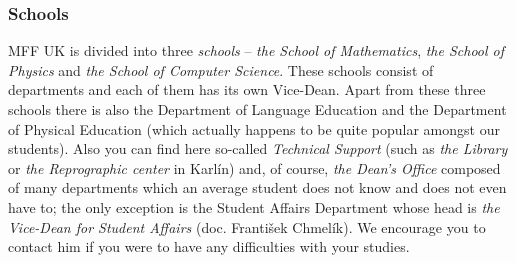 \subsubsection{Schools}
MFF UK is divided into three \textit{schools} – \textit{the School of
Mathematics}, \textit{the School of Physics} and \textit{the School of Computer
Science}. These schools consist of departments and each of them has its own
Vice-Dean.
Apart from these three schools there is also the Department of Language
Education and the Department of Physical Education (which actually happens to be
quite popular amongst our students).
Also you can find here so-called \textit{Technical Support} (such as \textit{the
Library} or \textit{the Reprographic center} in Karlín) and, of course,
\textit{the Dean's Office} composed of many departments which an average student
does not know and does not even have to; the only exception is the Student
Affairs Department whose head is \textit{the Vice-Dean for Student Affairs}
(doc. František Chmelík). We encourage you to contact him if you were to have
any difficulties with your studies.